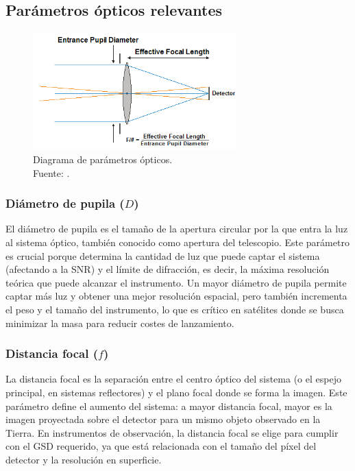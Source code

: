 \subsection{Parámetros ópticos relevantes}

\begin{figure}[H]
    \centering
    \includegraphics[width=0.7\textwidth]{3.Conceptos_Previos/eoirOptical1.png}
    \caption{Diagrama de parámetros ópticos. \\Fuente: \cite{entrance_pupil_diagram}.}
    \label{fig:Lente}
\end{figure}

\subsubsection*{Diámetro de pupila ($D$)}

El diámetro de pupila es el tamaño de la apertura circular por la que entra la luz al sistema óptico, también conocido como apertura del telescopio. Este parámetro es crucial porque determina la cantidad de luz que puede captar el sistema (afectando a la SNR) y el límite de difracción, es decir, la máxima resolución teórica que puede alcanzar el instrumento. Un mayor diámetro de pupila permite captar más luz y obtener una mejor resolución espacial, pero también incrementa el peso y el tamaño del instrumento, lo que es crítico en satélites donde se busca minimizar la masa para reducir costes de lanzamiento.

\subsubsection*{Distancia focal ($f$)}

La distancia focal es la separación entre el centro óptico del sistema (o el espejo principal, en sistemas reflectores) y el plano focal donde se forma la imagen. Este parámetro define el aumento del sistema: a mayor distancia focal, mayor es la imagen proyectada sobre el detector para un mismo objeto observado en la Tierra. En instrumentos de observación, la distancia focal se elige para cumplir con el GSD requerido, ya que está relacionada con el tamaño del píxel del detector y la resolución en superficie.


